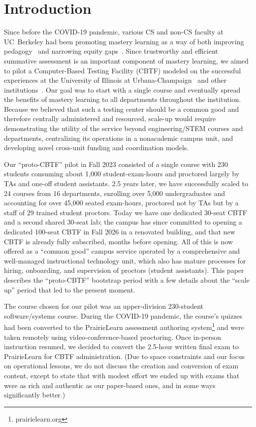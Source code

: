 
\section{Introduction}

Since before the COVID-19 pandemic, various CS and non-CS faculty at
UC~Berkeley had been promoting mastery 
learning as a way of both improving 
pedagogy~\cite{Bloom68} and narrowing equity gaps~\cite{guskey2007closing}.
Since trustworthy and efficient summative assessment is an important
component of mastery learning,
we aimed to pilot a Computer-Based Testing
Facility (CBTF) modeled on the successful
experiences at
the University of Illinois at Urbana-Champaign~\cite{zilles-testing-less-trying} and
other institutions~\cite{downey-cbtf}.
Our goal was to
start with a single course and eventually spread the benefits of
mastery learning to all departments throughout the institution.
Because we believed that such a testing center should be a common good
and therefore centrally administered and resourced, scale-up would
require demonstrating the utility of the service beyond
engineering/STEM courses and departments,
centralizing its operations in a nonacademic campus unit,
and developing novel cross-unit funding and coordination models.

Our ``proto-CBTF'' pilot in Fall 2023 consisted of a single course with
230 students consuming about 1,000 student-exam-hours and proctored
largely by TAs and one-off student assistants.
2.5 years later, we have successfully scaled to 24 courses from 16 departments, enrolling over
5,000 undergraduates and accounting for over 45,000
seated exam-hours, proctored not by TAs but by a staff of 29 trained student proctors.
Today we have one dedicated 30-seat CBTF and a second
shared 30-seat lab; the campus has since committed to opening a
dedicated 100-seat CBTF in Fall 2026 in a renovated building, 
and that new CBTF is already fully subscribed, months before opening.
All of this is now offered as  a ``common good'' campus service operated
by a comprehensive and
well-managed instructional technology unit, which also
has mature processes for hiring, onboarding, and supervision of
proctors (student assistants).
This paper describes the ``proto-CBTF'' bootstrap period with a few
details about the ``scale up'' period that led to the present moment.

The course chosen for our pilot was an upper-division
230-student software/systems course.
During the COVID-19 pandemic, the course's quizzes had been converted
to the PrairieLearn assessment authoring
system\footnote{prairielearn.org} and were taken remotely using
video-conference-based proctoring.  Once in-person instruction resumed,
we decided to convert the 2.5-hour written final exam to PrairieLearn
for CBTF administration.
(Due to space constraints and our focus on operational lessons, we do
not discuss the creation and conversion of exam content, except to
state that with modest effort we ended up with exams that were as rich and authentic as our paper-based ones, and in some ways
significantly better.)

